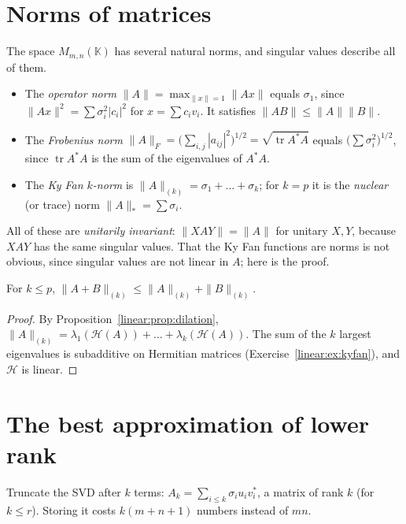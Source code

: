 \section{Norms of matrices}

The space $M_{m,n}(\mathbb K)$ has several natural norms, and singular values describe all of them.
\begin{itemize}
\item The \emph{operator norm} $\|A\|=\max_{\|x\|=1}\|Ax\|$ equals $\sigma_1$, since $\|Ax\|^2=\sum\sigma_i^2|c_i|^2$ for $x=
\sum c_iv_i$. It satisfies $\|AB\|\le\|A\|\|B\|$.
\item The \emph{Frobenius norm} $\|A\|_F=\bigl(\sum_{i,j}|a_{ij}|^2\bigr)^{1/2}=\sqrt{\operatorname{tr}A^*A}$ equals
$\bigl(\sum\sigma_i^2\bigr)^{1/2}$, since $\operatorname{tr}A^*A$ is the sum of the eigenvalues of $A^*A$.
\item The \emph{Ky Fan $k$-norm} is $\|A\|_{(k)}=\sigma_1+\dots+\sigma_k$; for $k=p$ it is the \emph{nuclear} (or trace) norm
$\|A\|_*=\sum\sigma_i$.
\end{itemize}
All of these are \emph{unitarily invariant}: $\|XAY\|=\|A\|$ for unitary $X,Y$, because $XAY$ has the same singular values.
That the Ky Fan functions are norms is not obvious, since singular values are not linear in $A$; here is the proof.

\begin{proposition}\label{linear:prop:kyfannorm}
For $k\le p$, $\|A+B\|_{(k)}\le\|A\|_{(k)}+\|B\|_{(k)}$.
\end{proposition}
\begin{proof}
By Proposition~\ref{linear:prop:dilation}, $\|A\|_{(k)}=\lambda_1(\mathcal H(A))+\dots+\lambda_k(\mathcal H(A))$. The sum of the $k$
largest eigenvalues is subadditive on Hermitian matrices (Exercise~\ref{linear:ex:kyfan}), and $\mathcal H$ is linear.
\end{proof}

\section{The best approximation of lower rank}

Truncate the SVD after $k$ terms: $A_k=\sum_{i\le k}\sigma_iu_iv_i^*$, a matrix of rank $k$ (for $k\le r$). Storing it costs
$k(m+n+1)$ numbers instead of $mn$.

